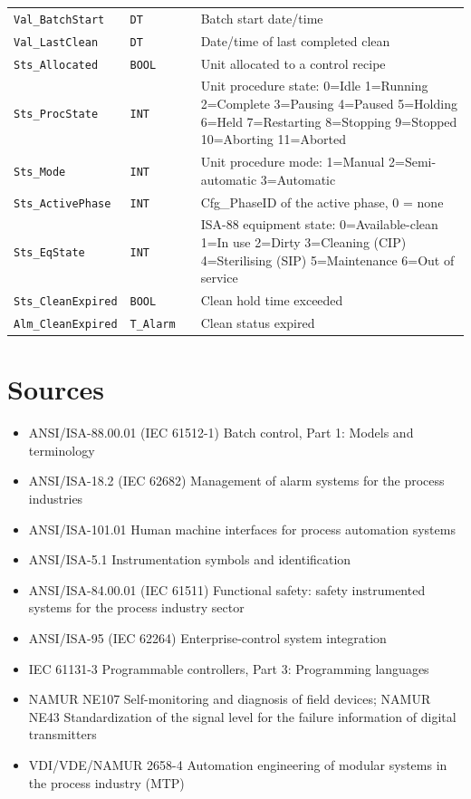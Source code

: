 {\begin{longtable}{@{}>{\raggedright\arraybackslash}p{3.4cm}>{\raggedright\arraybackslash}p{3.3cm}>{\raggedright\arraybackslash}p{1.3cm}>{\raggedright\arraybackslash}p{6.4cm}@{}}
\texttt{Val\_BatchStart} & \texttt{DT} &  & Batch start date/\allowbreak{}time \\
\texttt{Val\_LastClean} & \texttt{DT} &  & Date/\allowbreak{}time of last completed clean \\
\texttt{Sts\_Allocated} & \texttt{BOOL} &  & Unit allocated to a control recipe \\
\texttt{Sts\_ProcState} & \texttt{INT} &  & Unit procedure state: 0=Idle 1=Running 2=Complete 3=Pausing 4=Paused 5=Holding 6=Held 7=Restarting 8=Stopping 9=Stopped 10=Aborting 11=Aborted \\
\texttt{Sts\_Mode} & \texttt{INT} &  & Unit procedure mode: 1=Manual 2=Semi-automatic 3=Automatic \\
\texttt{Sts\_ActivePhase} & \texttt{INT} &  & Cfg\_PhaseID of the active phase, 0 = none \\
\texttt{Sts\_EqState} & \texttt{INT} &  & ISA-88 equipment state: 0=Available-clean 1=In use 2=Dirty 3=Cleaning (CIP) 4=Sterilising (SIP) 5=Maintenance 6=Out of service \\
\texttt{Sts\_CleanExpired} & \texttt{BOOL} &  & Clean hold time exceeded \\
\texttt{Alm\_CleanExpired} & \texttt{T\_Alarm} &  & Clean status expired \\
\bottomrule
\end{longtable}
}

\section{Sources}
\begin{itemize}[itemsep=1pt]
  \item ANSI/\allowbreak{}ISA-88.00.01 (IEC 61512-1) Batch control, Part 1: Models and terminology
  \item ANSI/\allowbreak{}ISA-18.2 (IEC 62682) Management of alarm systems for the process industries
  \item ANSI/\allowbreak{}ISA-101.01 Human machine interfaces for process automation systems
  \item ANSI/\allowbreak{}ISA-5.1 Instrumentation symbols and identification
  \item ANSI/\allowbreak{}ISA-84.00.01 (IEC 61511) Functional safety: safety instrumented systems for the process industry sector
  \item ANSI/\allowbreak{}ISA-95 (IEC 62264) Enterprise-control system integration
  \item IEC 61131-3 Programmable controllers, Part 3: Programming languages
  \item NAMUR NE107 Self-monitoring and diagnosis of field devices; NAMUR NE43 Standardization of the signal level for the failure information of digital transmitters
  \item VDI/\allowbreak{}VDE/\allowbreak{}NAMUR 2658-4 Automation engineering of modular systems in the process industry (MTP)
\end{itemize}
